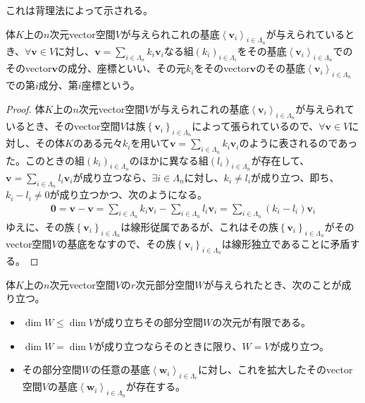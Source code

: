 \documentclass[dvipdfmx]{jsarticle}
\begin{document}
これは背理法によって示される。
\begin{dfn}
体$K$上の$n$次元vector空間$V$が与えられこれの基底$\left\langle \mathbf{v}_{i} \right\rangle_{i \in \varLambda_{n}}$が与えられているとき、$\forall\mathbf{v} \in V$に対し、$\mathbf{v} = \sum_{i \in \varLambda_{n}} {k_{i}\mathbf{v}_{i}}$なる組$\left( k_{i} \right)_{i \in \varLambda_{i}}$をその基底$\left\langle \mathbf{v}_{i} \right\rangle_{i \in \varLambda_{n}}$でのそのvector$\mathbf{v}$の成分、座標といい、その元$k_{i}$をそのvector$\mathbf{v}$のその基底$\left\langle \mathbf{v}_{i} \right\rangle_{i \in \varLambda_{n}}$での第$i$成分、第$i$座標という。
\end{dfn}
\begin{proof}
体$K$上の$n$次元vector空間$V$が与えられこれの基底$\left\langle \mathbf{v}_{i} \right\rangle_{i \in \varLambda_{n}}$が与えられているとき、そのvector空間$V$は族$\left\{ \mathbf{v}_{i} \right\}_{i \in \varLambda_{n}} $によって張られているので、$\forall\mathbf{v} \in V$に対し、その体$K$のある元々$k_{i}$を用いて$\mathbf{v} = \sum_{i \in \varLambda_{n}} {k_{i}\mathbf{v}_{i}}$のように表されるのであった。このときの組$\left( k_{i} \right)_{i \in \varLambda_{n}}$のほかに異なる組$\left( l_{i} \right)_{i \in \varLambda_{n}}$が存在して、$\mathbf{v} = \sum_{i \in \varLambda_{n}} {l_{i}\mathbf{v}_{i}}$が成り立つなら、$\exists i \in \varLambda_{n}$に対し、$k_{i} \neq l_{i}$が成り立つ、即ち、$k_{i} - l_{i} \neq 0$が成り立つかつ、次のようになる。
\begin{align*}
\mathbf{0} = \mathbf{v} - \mathbf{v} = \sum_{i \in \varLambda_{n}} {k_{i}\mathbf{v}_{i}} - \sum_{i \in \varLambda_{n}} {l_{i}\mathbf{v}_{i}} = \sum_{i \in \varLambda_{n}} {\left( k_{i} - l_{i} \right)\mathbf{v}_{i}}
\end{align*}
ゆえに、その族$\left\{ \mathbf{v}_{i} \right\}_{i \in \varLambda_{n}} $は線形従属であるが、これはその族$\left\{ \mathbf{v}_{i} \right\}_{i \in \varLambda_{n}} $がそのvector空間$V$の基底をなすので、その族$\left\{ \mathbf{v}_{i} \right\}_{i \in \varLambda_{n}} $は線形独立であることに矛盾する。
\end{proof}
\begin{thm}\label{2.1.1.22}
体$K$上の$n$次元vector空間$V$の$r$次元部分空間$W$が与えられたとき、次のことが成り立つ。
\begin{itemize}
\item
  $\dim W \leq \dim V$が成り立ちその部分空間$W$の次元が有限である。
\item
  $\dim W = \dim V$が成り立つならそのときに限り、$W = V$が成り立つ。
\item
  その部分空間$W$の任意の基底$\left\langle \mathbf{w}_{i} \right\rangle_{i \in \varLambda_{r}}$に対し、これを拡大したそのvector空間$V$の基底$\left\langle \mathbf{w}_{i} \right\rangle_{i \in \varLambda_{n}}$が存在する。
\end{itemize}
\end{thm}
\end{document}
